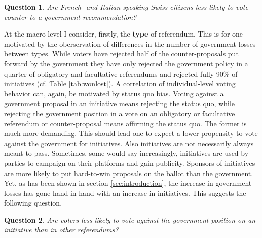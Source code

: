 \documentclass[11pt,a4paper]{article}\usepackage[]{graphicx}\usepackage[]{color}
\newtheorem{question}{Question}
\begin{document}
    \begin{question}
	    \begin{minipage}[t]{4 in}
	        Are French- and Italian-speaking Swiss citizens less likely to vote counter to a government recommendation?
	    \end{minipage}
    \end{question} 
    
    At the macro-level I consider, firstly, the \textbf{type} of referendum. This is for one motivated by the oberservation of differences in the number of government losses between types. While voters have rejected half of the counter-proposals put forward by the government they have only rejected the government policy in a quarter of obligatory and facultative referendums and rejected fully 90\% of initiatives (cf. Table \ref{tab:wonlost}). A correlation of individual-level voting behavior can, again, be motivated by status quo bias. Voting against a government proposal in an initiative means rejecting the status quo, while rejecting the government position in a vote on an obligatory or facultative referendum or counter-proposal means affirming the status quo. The former is much more demanding. This should lead one to expect a lower propensity to vote against the government for initiatives. 
    Also initiatives are not necessarily always meant to pass. Sometimes, some would say increasingly, initiatives are used by parties to campaign on their platforms and gain publicity. Sponsors of initiatives are more likely to put hard-to-win proposals on the ballot than the government. %
    Yet, as has been shown in section \ref{sec:introduction}, the increase in government losses has gone hand in hand with an increase in initiatives. This suggests the following question.
    
     \begin{question}
    	\begin{minipage}[t]{4 in}
    		Are voters less likely to vote against the government position on an initiative than in other referendums?
    	\end{minipage}
     \end{question}
     
    	
\end{document}
